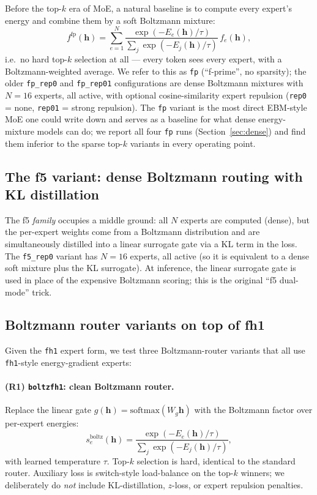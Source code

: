 \documentclass[oneside]{article}
\begin{document}
Before the top-$k$ era of MoE, a natural baseline is to compute every
expert's energy and combine them by a soft Boltzmann mixture:
\begin{equation}
  f^{\mathrm{fp}}(\mathbf{h})
    = \sum_{e=1}^{N} \frac{\exp(-E_e(\mathbf{h})/\tau)}{\sum_j \exp(-E_j(\mathbf{h})/\tau)}\, f_e(\mathbf{h}),
  \label{eq:fp}
\end{equation}
i.e.\ no hard top-$k$ selection at all --- every token sees every
expert, with a Boltzmann-weighted average. We refer to this as
\texttt{fp} (``f-prime'', no sparsity); the older \texttt{fp\_rep0} and
\texttt{fp\_rep01} configurations are dense Boltzmann mixtures with
$N{=}16$ experts, all active, with optional cosine-similarity expert
repulsion (\texttt{rep0} = none, \texttt{rep01} = strong repulsion).
The \texttt{fp} variant is the most direct EBM-style MoE one could write
down and serves as a baseline for what dense energy-mixture models can
do; we report all four \texttt{fp} runs (Section~\ref{sec:dense}) and
find them inferior to the sparse top-$k$ variants in every operating
point.

\subsection{The f5 variant: dense Boltzmann routing with KL distillation}
\label{sec:f5}

The f5 \emph{family} occupies a middle ground: all $N$ experts are
computed (dense), but the per-expert weights come from a Boltzmann
distribution and are simultaneously distilled into a linear surrogate
gate via a KL term in the loss. The \texttt{f5\_rep0} variant has
$N{=}16$ experts, all active (so it is equivalent to a dense soft mixture
plus the KL surrogate). At inference, the linear surrogate gate is used
in place of the expensive Boltzmann scoring; this is the original
``f5 dual-mode'' trick.

\subsection{Boltzmann router variants on top of fh1}
\label{sec:boltz-routers}

Given the \texttt{fh1} expert form, we test three Boltzmann-router
variants that all use \texttt{fh1}-style energy-gradient experts:

\paragraph{(R1) \texttt{boltzfh1}: clean Boltzmann router.}
Replace the linear gate
$g(\mathbf{h}) = \mathrm{softmax}(W_g \mathbf{h})$
with the Boltzmann factor over per-expert energies:
\begin{equation}
  s^{\mathrm{boltz}}_e(\mathbf{h})
    = \frac{\exp(-E_e(\mathbf{h})/\tau)}{\sum_j \exp(-E_j(\mathbf{h})/\tau)},
\end{equation}
with learned temperature $\tau$. Top-$k$ selection is hard, identical
to the standard router. Auxiliary loss is switch-style load-balance on
the top-$k$ winners; we deliberately do \emph{not} include
KL-distillation, $z$-loss, or expert repulsion penalties.
\end{document}
